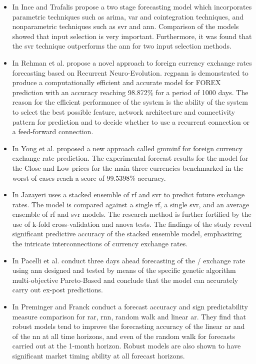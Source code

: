 \begin{itemize}
    \item In \cite{hybrid-model} Ince and Trafalis propose a two stage forecasting model which incorporates parametric techniques such as \gls{arima}, \gls{var} and \gls{cointegration} techniques, and nonparametric techniques such as \gls{svr} and \gls{ann}. Comparison of the models showed that input selection is very important. Furthermore, it was found that the \gls{svr} technique outperforms the \gls{ann} for two input selection methods.
    \item In \cite{cgp-rnn} Rehman et al. propose a novel approach to foreign currency exchange rates forecasting based on Recurrent Neuro-Evolution. \Gls{rcgpann} is demonstrated to produce a computationally efficient and accurate model for FOREX prediction with an accuracy reaching 98.872\% for a period of 1000 days. The reason for the efficient performance of the system is the ability of the system to select the best possible feature, network architecture and connectivity pattern for prediction and to decide whether to use a recurrent connection or a feed-forward connection.
    \item In \cite{neuro-fuzzy} Yong et al. proposed a new approach called \gls{gmminf} for foreign currency exchange rate prediction. The experimental forecast results for the model for the Close and Low prices for the main three currencies benchmarked in the worst of cases reach a score of 99.5398\% accuracy.
    \item In \cite{rf-svr} Jazayeri uses a stacked ensemble of \gls{rf} and \gls{svr} to predict future exchange rates. The model is compared against a single \gls{rf}, a single \gls{svr}, and an average ensemble of \gls{rf} and \gls{svr} models. The research method is further fortified by the use of k-fold cross-validation and \gls{anova} tests. The findings of the study reveal significant predictive accuracy of the stacked ensemble model, emphasizing the intricate interconnections of currency exchange rates.
    \item In \cite{genetic} Pacelli et al. conduct three days ahead forecasting of the / exchange rate using \gls{ann} designed and tested by means of the specific genetic algorithm multi-objective Pareto-Based and conclude that the model can accurately carry out ex-post predictions.
    \item In \cite{robust-regression} Preminger and Franck conduct a forecast accuracy and sign predictability measure comparison for \gls{rar}, \gls{rnn}, random walk and linear \gls{ar}. They find that robust models tend to improve the forecasting accuracy of the linear \gls{ar} and of the \gls{nn} at all time horizons, and even of the random walk for forecasts carried out at the 1-month horizon. Robust models are also shown to have significant market timing ability at all forecast horizons.
\end{itemize}

